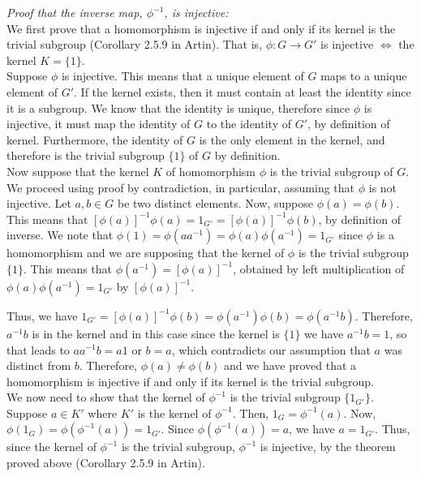 \textit{Proof that the inverse map, $\phi^{-1}$, is injective:}\\

We first prove that a homomorphism is injective if and only if its kernel is the trivial subgroup (Corollary 2.5.9 in Artin).  That is, $\phi: G \rightarrow G'$ is injective $\Longleftrightarrow$ the kernel $K = \{1 \}$.\\

Suppose $\phi$ is injective.  This means that a unique element of $G$ maps to a unique element of $G'$.  If the kernel exists, then it must contain at least the identity since it is a subgroup.  We know that the identity is unique, therefore since $\phi$ is injective, it must map the identity of $G$ to the identity of $G'$, by definition of kernel.  Furthermore, the identity of $G$ is the only element in the kernel, and therefore is the trivial subgroup $\{1\}$ of $G$ by definition.\\  

Now suppose that the kernel $K$ of homomorphism $\phi$ is the trivial subgroup of $G$.  We proceed using proof by contradiction, in particular, assuming that $\phi$ is not injective.  Let $a,b \in G$ be two distinct elements.  Now, suppose $\phi(a)=\phi(b)$.  This means that $[\phi(a)]^{-1}\phi(a)=1_{G'}=[\phi(a)]^{-1}\phi(b)$, by definition of inverse.  We note that $\phi(1)=\phi(a a^{-1})=\phi(a)\phi(a^{-1})=1_{G'}$ since $\phi$ is a homomorphism and we are supposing that the kernel of $\phi$ is the trivial subgroup $\{1\}$.  This means that $\phi(a^{-1})=[\phi(a)]^{-1}$, obtained by left multiplication of $\phi(a)\phi(a^{-1})=1_{G'}$  by  $[\phi(a)]^{-1}$.

Thus, we have $1_{G'}=[\phi(a)]^{-1}\phi(b)=\phi(a^{-1})\phi(b)=\phi(a^{-1}b)$.  Therefore, $a^{-1}b$ is in the kernel and in this case since the kernel is $\{1\}$ we have $a^{-1}b=1$, so that leads to $aa^{-1}b=a1$ or $b=a$, which contradicts our assumption that $a$ was distinct from $b$.  Therefore, $\phi(a) \ne \phi(b)$ and we have proved that a homomorphism is injective if and only if its kernel is the trivial subgroup.\\

We now need to show that the kernel of $\phi^{-1}$ is the trivial subgroup $\{1_{G'}\}$.\\

Suppose $a \in K'$ where $K'$ is the kernel of $\phi^{-1}$.  Then, $1_{G} =\phi^{-1}(a)$.  Now, $\phi(1_{G})=\phi(\phi^{-1}(a))=1_{G'}$.  Since $\phi(\phi^{-1}(a))=a$, we have $a=1_{G'}$.  Thus, since the kernel of $\phi^{-1}$ is the trivial subgroup, $\phi^{-1}$ is injective, by the theorem proved above (Corollary 2.5.9 in Artin).\\

